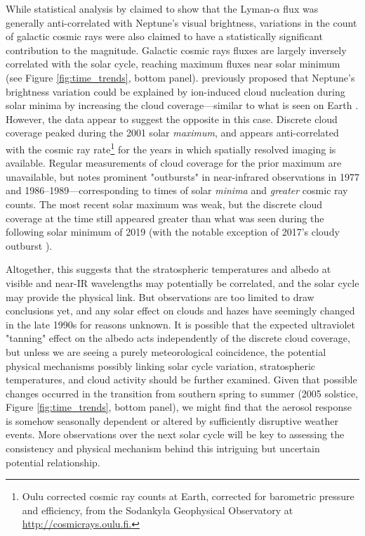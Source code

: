 \documentclass[twocolumn,10pt]{aastex631}
\begin{document}
While statistical analysis by \citet{aplin2016determining} claimed to show that the Lyman-$\alpha$ flux was generally anti-correlated with Neptune's visual brightness, variations in the count of galactic cosmic rays were also claimed to have a statistically significant contribution to the magnitude. Galactic cosmic rays fluxes are largely inversely correlated with the solar cycle, reaching maximum fluxes near solar minimum (see Figure \ref{fig:time_trends}, bottom panel).  \citet{moses1989neptune} previously proposed that Neptune's brightness variation could be explained by ion-induced cloud nucleation during solar minima by increasing the cloud coverage---similar to what is seen on Earth \citep{svensmark1997variation}. However, the data appear to suggest the opposite in this case. Discrete cloud coverage peaked during the 2001 solar \emph{maximum}, and appears anti-correlated with the cosmic ray rate\footnote{Oulu corrected cosmic ray counts at Earth, corrected for barometric pressure and efficiency, from the Sodankyla Geophysical Observatory at \url{http://cosmicrays.oulu.fi.}} for the years in which spatially resolved imaging is available.  Regular measurements of cloud coverage for the prior maximum are unavailable, but \citet{lockwood2002photometric} notes prominent "outbursts" in near-infrared observations in 1977 and 1986--1989---corresponding to times of solar \emph{minima} and \emph{greater} cosmic ray counts. The most recent solar maximum was weak, but the discrete cloud coverage at the time still appeared greater than what was seen during the following solar minimum of 2019 (with the notable exception of 2017's cloudy outburst \citep{molter2019neptune}).  

Altogether, this suggests that the stratospheric temperatures and albedo at visible and near-IR wavelengths may potentially be correlated, and the solar cycle may provide the physical link.  But observations are too limited to draw conclusions yet, and any solar effect on clouds and hazes have seemingly changed in the late 1990s for reasons unknown. It is possible that the expected ultraviolet "tanning" effect on the albedo acts independently of the discrete cloud coverage, but unless we are seeing a purely meteorological coincidence, the potential physical mechanisms possibly linking solar cycle variation, stratospheric temperatures, and cloud activity should be further examined. Given that possible changes occurred in the transition from southern spring to summer (2005 solstice, Figure \ref{fig:time_trends}, bottom panel), we might find that the aerosol response is somehow seasonally dependent or altered by sufficiently disruptive weather events. More observations over the next solar cycle will be key to assessing the consistency and physical mechanism behind this intriguing but uncertain potential relationship.
\end{document}
